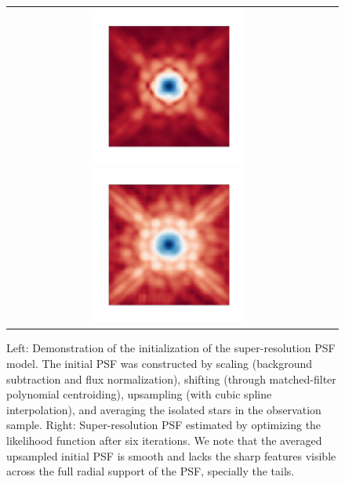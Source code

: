 \begin{figure}
 \begin{tabular}{cc}
\includegraphics[width=0.5\textwidth]{figures/wfc3ir/super0.png}
\includegraphics[width=0.5\textwidth]{figures/wfc3ir/super2.png}
\end{tabular}
\caption{\label{fig:srpsf} Left: Demonstration of the initialization of the super-resolution PSF model. The initial PSF was constructed by scaling (background subtraction and flux normalization), shifting (through matched-filter polynomial centroiding), upsampling (with cubic spline interpolation), and averaging the isolated stars in the observation sample. 
Right: Super-resolution PSF estimated by optimizing the likelihood function after six iterations. We note that the averaged upsampled initial PSF is smooth and lacks the sharp features visible across the full radial support of the PSF, specially the tails.}
\end{figure}

